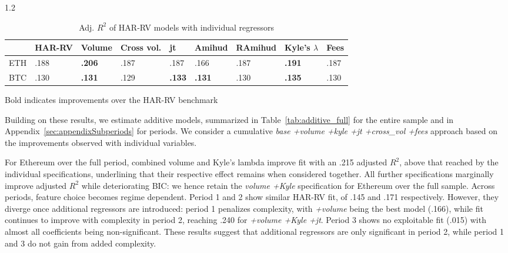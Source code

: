 \documentclass[10pt]{article}
\begin{document}
\begin{setstretch}{1.2}
\begin{table}[!htbp]
\centering
\small
\caption{Adj. $R^2$ of HAR-RV models with individual regressors}
\vspace{4pt}
\label{tab:coefs}
\renewcommand{\arraystretch}{1.3}
\begin{tabular}{lllllllll}
 & \textbf{HAR-RV} & \textbf{Volume} & \textbf{Cross vol.} & \textbf{jt} & \textbf{Amihud} & \textbf{RAmihud} & \textbf{Kyle's $\lambda$} & \textbf{Fees}  \\
\hline
ETH & .188     & \textbf{.206} & .187  & .187 & .166  & .187  & \textbf{.191} & .187 \\
BTC & .130     & \textbf{.131} & .129  & \textbf{.133} & \textbf{.131}  & .130  & \textbf{.135} & .130 \\
\hline
\end{tabular}
\begin{tablenotes}
\small
\item Bold indicates improvements over the HAR-RV benchmark
\end{tablenotes}
\end{table}

Building on these results, we estimate additive models, summarized in Table~\ref{tab:additive_full} for the entire sample and in Appendix~\ref{sec:appendixSubperiods} for periods. We consider a cumulative \textit{base +volume +kyle +jt +cross\_vol +fees} approach based on the improvements observed with individual variables.

For Ethereum over the full period, combined volume and Kyle's lambda improve fit with an .215 adjusted $R^2$, above that reached by the individual specifications, underlining that their respective effect remains when considered together. All further specifications marginally improve adjusted $R^2$ while deteriorating BIC: we hence retain the \textit{volume +Kyle} specification for Ethereum over the full sample. Across periods, feature choice becomes regime dependent. Period 1 and 2 show similar HAR-RV fit, of .145 and .171 respectively. However, they diverge once additional regressors are introduced: period 1 penalizes complexity, with \textit{+volume} being the best model (.166), while fit continues to improve with complexity in period 2, reaching .240 for \textit{+volume +Kyle +jt}. Period 3 shows no exploitable fit (.015) with almost all coefficients being non-significant. These results suggest that additional regressors are only significant in period 2, while period 1 and 3 do not gain from added complexity. 


\end{setstretch}
\end{document}
